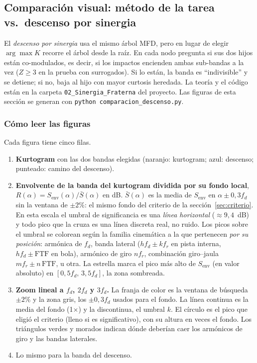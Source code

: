 \documentclass[11pt,a4paper]{article}
\begin{document}
\subsection{Comparación visual: método de la tarea vs.\ descenso por sinergia}\label{sec:comp}
El \emph{descenso por sinergia} usa el mismo árbol MFD, pero en lugar de elegir $\arg\max K$ recorre el árbol desde la raíz. En cada nodo pregunta si sus dos hijos están co-modulados, es decir, si los impactos encienden ambas sub-bandas a la vez ($Z\ge3$ en la prueba con surrogados). Si lo están, la banda es ``indivisible'' y se detiene; si no, baja al hijo con mayor curtosis heredada. La teoría y el código están en la carpeta \texttt{02\_Sinergia\_Fraterna} del proyecto. Las figuras de esta sección se generan con \texttt{python comparacion\_descenso.py}.

\subsubsection{Cómo leer las figuras}
Cada figura tiene cinco filas.
\begin{enumerate}[itemsep=1pt]
\item \textbf{Kurtogram} con las dos bandas elegidas (naranjo: kurtogram; azul: descenso; punteado: camino del descenso).
\item \textbf{Envolvente de la banda del kurtogram dividida por su fondo local}, $R(\alpha)=S_{\mathrm{env}}(\alpha)/\bar S(\alpha)$ en dB. $\bar S(\alpha)$ es la media de $S_{\mathrm{env}}$ en $\alpha\pm0{,}3f_d$ sin la ventana de $\pm2\%$: el mismo fondo del criterio de la sección~\ref{sec:criterio}. En esta escala el umbral de significancia es una \emph{línea horizontal} ($\approx9{,}4$~dB) y todo pico que la cruza es una línea discreta real, no ruido. Los picos sobre el umbral se colorean según la familia cinemática a la que pertenecen \emph{por su posición}: armónica de $f_d$, banda lateral ($hf_d\pm kf_r$ en pista interna, $hf_d\pm\mathrm{FTF}$ en bola), armónico de giro $nf_r$, combinación giro--jaula $mf_r\pm n\,\mathrm{FTF}$, u otra. La estrella marca el pico más alto de $S_{\mathrm{env}}$ (en valor absoluto) en $[0{,}5f_d,\,3{,}5f_d]$, la zona sombreada.
\item \textbf{Zoom lineal a $f_d$, $2f_d$ y $3f_d$.} La franja de color es la ventana de búsqueda $\pm2\%$ y la zona gris, los $\pm0{,}3f_d$ usados para el fondo. La línea continua es la media del fondo (1$\times$) y la discontinua, el umbral $k$. El círculo es el pico que eligió el criterio (lleno si es significativo), con su altura en veces el fondo. Los triángulos verdes y morados indican dónde deberían caer los armónicos de giro y las bandas laterales.
\item[4--5.] Lo mismo para la banda del descenso.
\end{enumerate}
\end{document}
